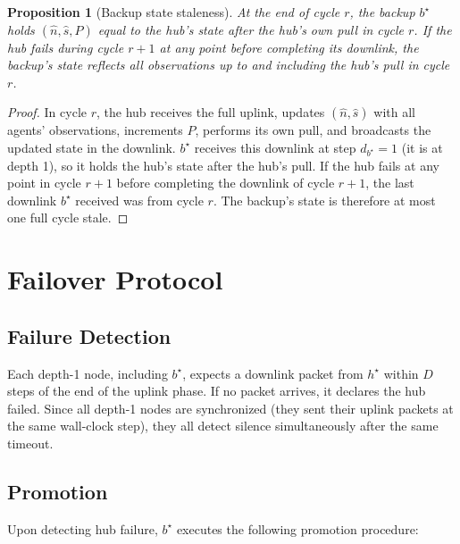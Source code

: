\documentclass{article}
\newtheorem{proposition}{Proposition}
\begin{document}
\begin{proposition}[Backup state staleness]
\label{prop:staleness}
    At the end of cycle $r$, the backup $b^\star$ holds $(\hat{n}, \hat{s}, P)$ equal to
    the hub's state after the hub's own pull in cycle $r$. If the hub fails during cycle
    $r+1$ at any point before completing its downlink, the backup's state reflects all
    observations up to and including the hub's pull in cycle $r$.
\end{proposition}

\begin{proof}
    In cycle $r$, the hub receives the full uplink, updates $(\hat{n}, \hat{s})$ with all
    agents' observations, increments $P$, performs its own pull, and broadcasts the
    updated state in the downlink. $b^\star$ receives this downlink at step $d_{b^\star} =
    1$ (it is at depth 1), so it holds the hub's state after the hub's pull. If the hub
    fails at any point in cycle $r+1$ before completing the downlink of cycle $r+1$,
    the last downlink $b^\star$ received was from cycle $r$. The backup's state is
    therefore at most one full cycle stale.
\end{proof}

\section{Failover Protocol}

\subsection{Failure Detection}

Each depth-1 node, including $b^\star$, expects a downlink packet from $h^\star$ within
$D$ steps of the end of the uplink phase. If no packet arrives, it declares the hub
failed. Since all depth-1 nodes are synchronized (they sent their uplink packets at the
same wall-clock step), they all detect silence simultaneously after the same timeout.

\subsection{Promotion}

Upon detecting hub failure, $b^\star$ executes the following promotion procedure:
\end{document}
